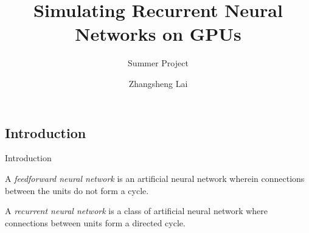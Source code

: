 \documentclass[10pt]{beamer}
\title{Simulating Recurrent Neural Networks on GPUs}
\subtitle{Summer Project}
\author{Zhangsheng Lai}
\begin{document}
\begin{frame}
\titlepage
\end{frame}



\begin{frame}{}
\section{Introduction}
\end{frame}

\begin{frame}{Introduction}
\begin{definition}
A \emph{feedforward neural network} is an artificial neural network wherein connections between the units do not form a cycle.
\end{definition}

\begin{definition}
A \emph{recurrent neural network} is a class of artificial neural network where connections between units form a directed cycle.
\end{definition}

\end{frame}
\end{document}
